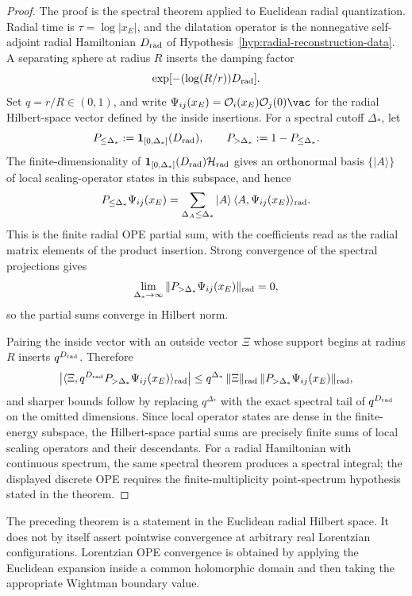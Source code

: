 \begin{proof}
The proof is the spectral theorem applied to Euclidean radial quantization.
Radial time is \(\tau=\log |x_E|\), and the dilatation operator is the
nonnegative self-adjoint radial Hamiltonian \(D_{\rm rad}\) of
Hypothesis~\ref{hyp:radial-reconstruction-data}.  A separating sphere at
radius \(R\) inserts the damping factor
\[
  \exp[-(\log(R/r))D_{\rm rad}] .
\]
Set \(q=r/R\in(0,1)\), and write
\(\Psi_{ij}(x_E)=\mathcal O_i(x_E)\mathcal O_j(0)\vac\) for the radial
Hilbert-space vector defined by the inside insertions.  For a spectral cutoff
\(\Delta_*\), let
\[
  P_{\le\Delta_*}
  :=
  \mathbf 1_{[0,\Delta_*]}(D_{\rm rad}),\qquad
  P_{>\Delta_*}:=1-P_{\le\Delta_*}.
\]
The finite-dimensionality of
\(\mathbf 1_{[0,\Delta_*]}(D_{\rm rad})\mathcal H_{\rm rad}\) gives an
orthonormal basis \(\{|A\rangle\}\) of local scaling-operator states in this
subspace, and hence
\[
  P_{\le\Delta_*}\Psi_{ij}(x_E)
  =
  \sum_{\Delta_A\le\Delta_*}
  |A\rangle\,\langle A,\Psi_{ij}(x_E)\rangle_{\rm rad}.
\]
This is the finite radial OPE partial sum, with the coefficients read as the
radial matrix elements of the product insertion.  Strong convergence of the
spectral projections gives
\[
  \lim_{\Delta_*\to\infty}
  \|P_{>\Delta_*}\Psi_{ij}(x_E)\|_{\rm rad}=0,
\]
so the partial sums converge in Hilbert norm.

Pairing the inside vector with an outside vector \(\Xi\) whose support begins
at radius \(R\) inserts \(q^{D_{\rm rad}}\).  Therefore
\[
  \left|
  \langle \Xi,q^{D_{\rm rad}}P_{>\Delta_*}\Psi_{ij}(x_E)\rangle_{\rm rad}
  \right|
  \le
  q^{\Delta_*}\,
  \|\Xi\|_{\rm rad}\,
  \|P_{>\Delta_*}\Psi_{ij}(x_E)\|_{\rm rad},
\]
and sharper bounds follow by replacing \(q^{\Delta_*}\) with the exact
spectral tail of \(q^{D_{\rm rad}}\) on the omitted dimensions.  Since local
operator states are dense in the finite-energy subspace, the Hilbert-space
partial sums are precisely finite sums of local scaling operators and their
descendants.  For a radial Hamiltonian with continuous spectrum, the same
spectral theorem produces a spectral integral; the displayed discrete OPE
requires the finite-multiplicity point-spectrum hypothesis stated in the
theorem.
\end{proof}

The preceding theorem is a statement in the Euclidean radial Hilbert space.
It does not by itself assert pointwise convergence at arbitrary real
Lorentzian configurations.  Lorentzian OPE convergence is obtained by applying
the Euclidean expansion inside a common holomorphic domain and then taking the
appropriate Wightman boundary value.

